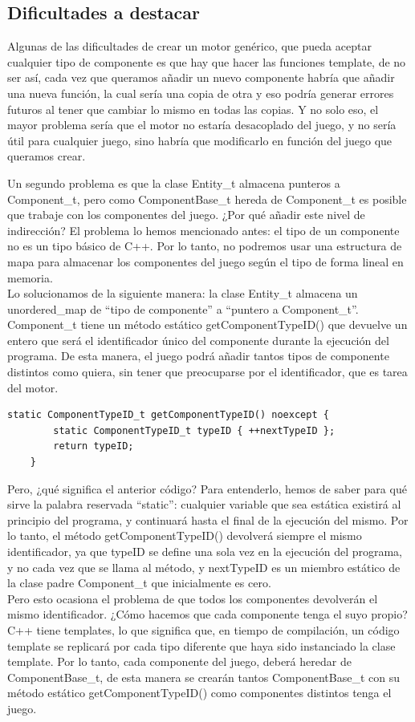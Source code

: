 \subsection{Dificultades a destacar}
Algunas de las dificultades de crear un motor genérico, que pueda aceptar cualquier tipo de componente es que hay que hacer las funciones template, de no ser así, cada vez que queramos añadir un nuevo componente habría que añadir una nueva función, la cual sería una copia de otra y eso podría generar errores futuros al tener que cambiar lo mismo en todas las copias. Y no solo eso, el mayor problema sería que el motor no estaría desacoplado del juego, y no sería útil para cualquier juego, sino habría que modificarlo en función del juego que queramos crear.

Un segundo problema es que la clase Entity\_t almacena punteros a Component\_t, pero como ComponentBase\_t hereda de Component\_t es posible que trabaje con los componentes del juego. ¿Por qué añadir este nivel de indirección? El problema lo hemos mencionado antes: el tipo de un componente no es un tipo básico de C++. Por lo tanto, no podremos usar una estructura de mapa para almacenar los componentes del juego según el tipo de forma lineal en memoria.
\\
Lo solucionamos de la siguiente manera: la clase Entity\_t almacena un unordered\_map de ``tipo de componente'' a ``puntero a Component\_t''. Component\_t tiene un método estático getComponentTypeID() que devuelve un entero que será el identificador único del componente durante la ejecución del programa. De esta manera, el juego podrá añadir tantos tipos de componente distintos como quiera, sin tener que preocuparse por el identificador, que es tarea del motor.
\begin{lstlisting}[style=C-color, caption={Cómo tener un número variable de componentes, sin tener que añadir un nuevo identificador con cada componente nuevo.},label=static-method]
	static ComponentTypeID_t getComponentTypeID() noexcept {
		static ComponentTypeID_t typeID { ++nextTypeID };
		return typeID;
	}
\end{lstlisting}
Pero, ¿qué significa el anterior código? Para entenderlo, hemos de saber para qué sirve la palabra reservada ``static'': cualquier variable que sea estática existirá al principio del programa, y continuará hasta el final de la ejecución del mismo. Por lo tanto, el método getComponentTypeID() devolverá siempre el mismo identificador, ya que typeID se define una sola vez en la ejecución del programa, y no cada vez que se llama al método, y nextTypeID es un miembro estático de la clase padre Component\_t que inicialmente es cero.
\\
Pero esto ocasiona el problema de que todos los componentes devolverán el mismo identificador. ¿Cómo hacemos que cada componente tenga el suyo propio? C++ tiene templates, lo que significa que, en tiempo de compilación, un código template se replicará por cada tipo diferente que haya sido instanciado la clase template. Por lo tanto, cada componente del juego, deberá heredar de ComponentBase\_t, de esta manera se crearán tantos ComponentBase\_t con su método estático getComponentTypeID() como componentes distintos tenga el juego.

